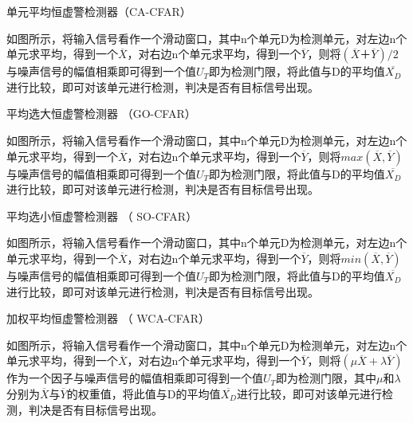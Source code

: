 \documentclass[12pt,a4paper]{article} %
\begin{document}
		\begin{compactitem} 
 			\item 单元平均恒虚警检测器（CA-CFAR）
 			\par 如图所示，将输入信号看作一个滑动窗口，其中n个单元D为检测单元，对左边n个单元求平均，得到一个$\overline{X}$，对右边n个单元求平均，得到一个$\overline{Y}$，则将$(\overline{X}＋\overline{Y})/2$与噪声信号的幅值相乘即可得到一个值$U_T$即为检测门限，将此值与D的平均值$\overline{X_D}$进行比较，即可对该单元进行检测，判决是否有目标信号出现。
 			
			\item 平均选大恒虚警检测器  （GO-CFAR）
			\par 如图所示，将输入信号看作一个滑动窗口，其中n个单元D为检测单元，对左边n个单元求平均，得到一个$\overline{X}$，对右边n个单元求平均，得到一个$\overline{Y}$，则将$max(\overline{X},\overline{Y})$与噪声信号的幅值相乘即可得到一个值$U_T$即为检测门限，将此值与D的平均值$\overline{X_D}$进行比较，即可对该单元进行检测，判决是否有目标信号出现。
			
			\item 平均选小恒虚警检测器  （ SO-CFAR）
			\par 如图所示，将输入信号看作一个滑动窗口，其中n个单元D为检测单元，对左边n个单元求平均，得到一个$\overline{X}$，对右边n个单元求平均，得到一个$\overline{Y}$，则将$min(\overline{X},\overline{Y})$与噪声信号的幅值相乘即可得到一个值$U_T$即为检测门限，将此值与D的平均值$\overline{X_D}$进行比较，即可对该单元进行检测，判决是否有目标信号出现。
			\item 加权平均恒虚警检测器 （  WCA-CFAR）
			\par 如图所示，将输入信号看作一个滑动窗口，其中n个单元D为检测单元，对左边n个单元求平均，得到一个$\overline{X}$，对右边n个单元求平均，得到一个$\overline{Y}$，则将$(\mu \overline{X}+\lambda \overline{Y})$作为一个因子与噪声信号的幅值相乘即可得到一个值$U_T$即为检测门限，其中$\mu$和$\lambda$分别为$\overline{X}$与$\overline{Y}$的权重值，将此值与D的平均值$\overline{X_D}$进行比较，即可对该单元进行检测，判决是否有目标信号出现。

		 \end{compactitem}	
		
		
\end{document}
